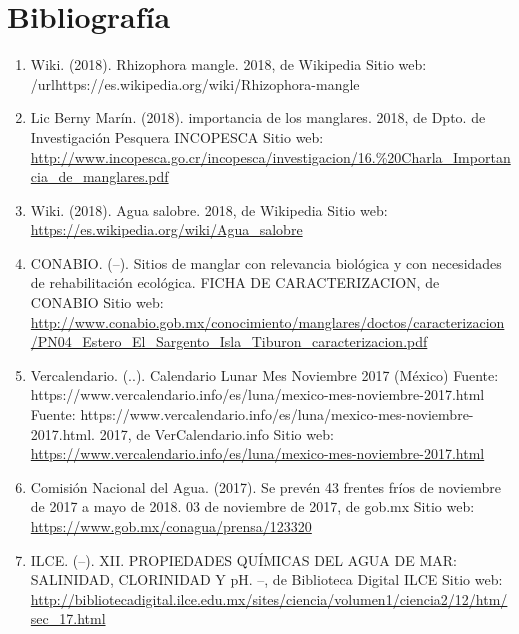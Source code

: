 \documentclass[12pt]{article}
\begin{document}
\pagebreak
\section{Bibliograf\'ia}
\noindent

\begin{enumerate} [\hspace{16pt} 1.]
		\item Wiki. (2018). Rhizophora mangle. 2018, de Wikipedia Sitio web: /url{https://es.wikipedia.org/wiki/Rhizophora-mangle}

		\item Lic Berny Mar\'in. (2018). importancia de los manglares. 2018, de Dpto. de Investigaci\'on Pesquera INCOPESCA Sitio web: \url{http://www.incopesca.go.cr/incopesca/investigacion/16.%20Charla_Importancia_de_manglares.pdf}
        
        \item Wiki. (2018). Agua salobre. 2018, de Wikipedia Sitio web: \url{https://es.wikipedia.org/wiki/Agua_salobre}
        
        \item CONABIO. (--). Sitios de manglar con relevancia biológica y con necesidades de rehabilitación ecológica. FICHA DE CARACTERIZACION, de CONABIO Sitio web: \url{http://www.conabio.gob.mx/conocimiento/manglares/doctos/caracterizacion/PN04_Estero_El_Sargento_Isla_Tiburon_caracterizacion.pdf}
        
        \item Vercalendario. (..). Calendario Lunar Mes Noviembre 2017 (México) Fuente: https://www.vercalendario.info/es/luna/mexico-mes-noviembre-2017.html Fuente: https://www.vercalendario.info/es/luna/mexico-mes-noviembre-2017.html. 2017, de VerCalendario.info Sitio web: \url{https://www.vercalendario.info/es/luna/mexico-mes-noviembre-2017.html}
        
        \item Comisión Nacional del Agua. (2017). Se prevén 43 frentes fríos de noviembre de 2017 a mayo de 2018. 03 de noviembre de 2017, de gob.mx Sitio web: \url{https://www.gob.mx/conagua/prensa/123320}
        
       \item ILCE. (--). XII. PROPIEDADES QUÍMICAS DEL AGUA DE MAR: SALINIDAD, CLORINIDAD Y pH. --, de Biblioteca Digital ILCE Sitio web: \url{http://bibliotecadigital.ilce.edu.mx/sites/ciencia/volumen1/ciencia2/12/htm/sec_17.html}
        
\end{enumerate}

\end{document}
